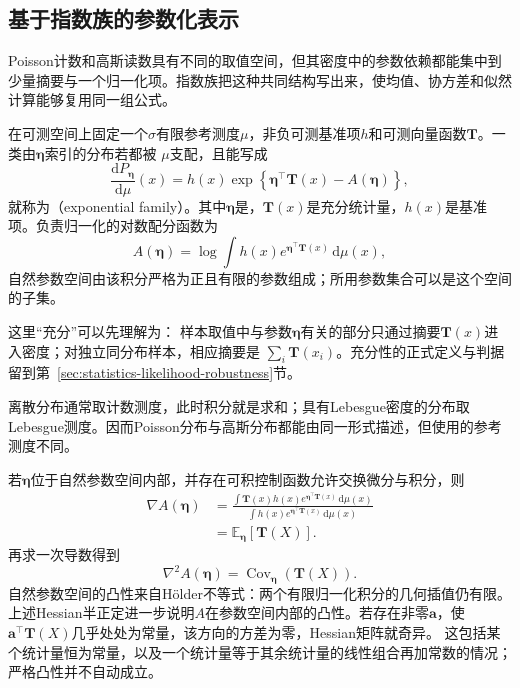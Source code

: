 \subsection{基于指数族的参数化表示}
Poisson计数和高斯读数具有不同的取值空间，但其密度中的参数依赖都能集中到少量摘要与一个归一化项。指数族把这种共同结构写出来，使均值、协方差和似然计算能够复用同一组公式。
\begin{definition}[指数族]
  \label{def:probability-exponential-family}
在可测空间上固定一个\(\sigma\)有限参考测度\(\mu\)，非负可测基准项\(h\)和可测向量函数\(\bm T\)。一类由\(\bm{\eta}\)索引的分布若都被
\(\mu\)支配，且能写成
\begin{equation}
  \frac{\mathrm{d}P_{\bm{\eta}}}{\mathrm{d}\mu}(x)
  =
  h(x)\exp\left\{
    \bm{\eta}^{\top}\bm{T}(x)-A(\bm{\eta})
  \right\},
  \label{eq:probability-exponential-family}
\end{equation}
就称为（exponential family）。其中\(\bm{\eta}\)是，\(\bm{T}(x)\)是充分统计量，\(h(x)\)是基准项。负责归一化的对数配分函数为
\[ A(\bm{\eta})
  =\log\int h(x)e^{\bm{\eta}^{\top}\bm{T}(x)}\,\mathrm{d}\mu(x), \]
自然参数空间由该积分严格为正且有限的参数组成；所用参数集合可以是这个空间的子集。
\end{definition}
这里“充分”可以先理解为：
样本取值中与参数\(\bm{\eta}\)有关的部分只通过摘要\(\bm{T}(x)\)进入密度；对独立同分布样本，相应摘要是
\(\sum_i\bm{T}(x_i)\)。充分性的正式定义与判据留到第~\ref{sec:statistics-likelihood-robustness}节。

离散分布通常取计数测度，此时积分就是求和；具有Lebesgue密度的分布取Lebesgue测度。因而Poisson分布与高斯分布都能由同一形式描述，但使用的参考测度不同。

若\(\bm{\eta}\)位于自然参数空间内部，并存在可积控制函数允许交换微分与积分，则
\[
\begin{aligned}
  \nabla A(\bm{\eta})
  &=
  \frac{\int \bm{T}(x)h(x)
  e^{\bm{\eta}^{\top}\bm{T}(x)}\,\mathrm{d}\mu(x)}
  {\int h(x)e^{\bm{\eta}^{\top}\bm{T}(x)}\,\mathrm{d}\mu(x)}\\
  &=
  \mathbb{E}_{\bm{\eta}}[\bm{T}(X)].
\end{aligned}
\]
再求一次导数得到
\begin{equation}
  \nabla^2 A(\bm{\eta})
  =
  \operatorname{Cov}_{\bm{\eta}}(\bm{T}(X)).
  \label{eq:probability-log-partition-hessian}
\end{equation}
自然参数空间的凸性来自Hölder不等式：两个有限归一化积分的几何插值仍有限。上述Hessian半正定进一步说明\(A\)在参数空间内部的凸性。若存在非零\(\bm a\)，使
\(\bm a^\top\bm T(X)\)几乎处处为常量，该方向的方差为零，Hessian矩阵就奇异。
这包括某个统计量恒为常量，以及一个统计量等于其余统计量的线性组合再加常数的情况；
严格凸性并不自动成立。

